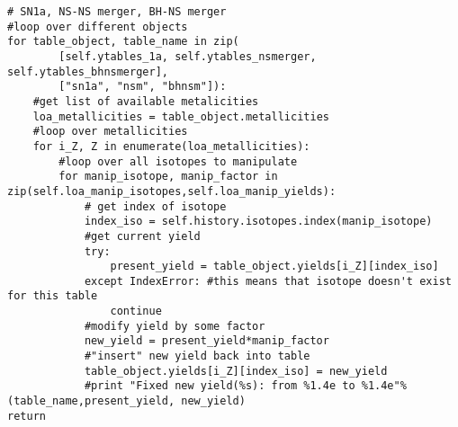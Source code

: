 \begin{lstlisting}
# SN1a, NS-NS merger, BH-NS merger
#loop over different objects
for table_object, table_name in zip(
        [self.ytables_1a, self.ytables_nsmerger, self.ytables_bhnsmerger],
        ["sn1a", "nsm", "bhnsm"]):
    #get list of available metalicities
    loa_metallicities = table_object.metallicities
    #loop over metallicities
    for i_Z, Z in enumerate(loa_metallicities):
        #loop over all isotopes to manipulate
        for manip_isotope, manip_factor in zip(self.loa_manip_isotopes,self.loa_manip_yields):
            # get index of isotope
            index_iso = self.history.isotopes.index(manip_isotope)
            #get current yield
            try:
                present_yield = table_object.yields[i_Z][index_iso]
            except IndexError: #this means that isotope doesn't exist for this table
                continue
            #modify yield by some factor
            new_yield = present_yield*manip_factor
            #"insert" new yield back into table
            table_object.yields[i_Z][index_iso] = new_yield
            #print "Fixed new yield(%s): from %1.4e to %1.4e"%(table_name,present_yield, new_yield)
return
\end{lstlisting}

